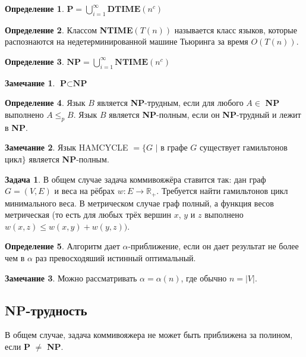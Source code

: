 \documentclass[a4paper,12pt]{article}
\renewcommand{\leq}{\ensuremath{\leqslant}}
\theoremstyle{plain}
\theoremstyle{definition}
\newtheorem{definition}{Определение}[section]
\newtheorem*{note}{Замечание}
\newtheorem*{tasks}{Задача}
\theoremstyle{remark}
\begin{document}
\begin{definition}
    $\textbf{P} = \bigcup_{i=1}^\infty \textbf{DTIME}\left(n^c\right)$
\end{definition}

\begin{definition}
    Классом \textbf{NTIME}$\left(T(n)\right)$ называется класс языков, которые распознаются на недетерминированной машине Тьюринга за время $O(T(n))$.
\end{definition}

\begin{definition}
    $\textbf{NP} = \bigcup_{i=1}^\infty \textbf{NTIME}\left(n^c\right)$
\end{definition}

\begin{note}
    $\textbf{P} \subset \textbf{NP}$
\end{note}

\begin{definition}
Язык $B$ является \textbf{NP}-трудным, если для любого $A \in$ \textbf{NP} выполнено $A \leq_p B$. Язык $B$ является \textbf{NP}-полным, если он \textbf{NP}-трудный и лежит в \textbf{NP}.
\end{definition}

\begin{note}
    Язык \textnormal{\textsf{HAMCYCLE}} $= \{ G$ $|$ в графе $G$ существует гамильтонов цикл$\}$ является \textbf{NP}-полным.
\end{note}

\begin{tasks}
    В общем случае задача коммивояжёра ставится так: дан граф $G = \left(V, E\right)$ и веса
    на рёбрах $w: E \rightarrow \mathbb{R}_+$. Требуется найти гамильтонов цикл минимального веса.
    В метрическом случае граф полный, а функция весов метрическая (то есть для
    любых трёх вершин $x$, $y$ и $z$ выполнено $w(x, z) \leq w(x, y) + w(y, z))$.
\end{tasks}

\begin{definition}
    Алгоритм дает $\alpha$-приближение, если он дает результат не более чем в $\alpha$ раз превосходяший истинный оптимальный.
\end{definition}

\begin{note}
    Можно рассматривать $\alpha = \alpha(n)$, где обычно $n = \left| V \right|$.
\end{note}


\subsection{NP-трудность}
В общем случае, задача коммивояжера не может быть приближена за полином, если \textbf{P} $\neq$ \textbf{NP}.
\end{document}
